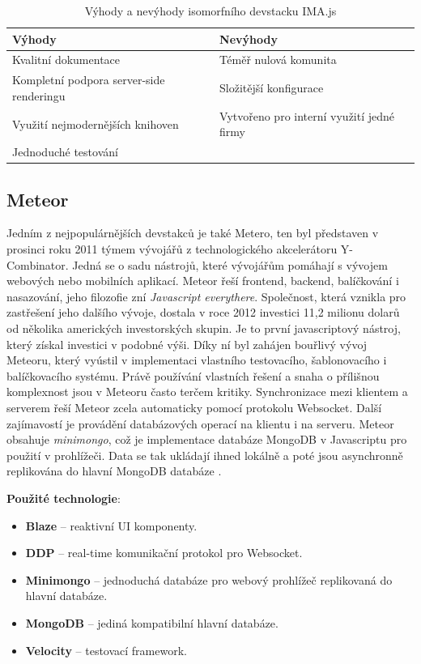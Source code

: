 \begin{table}[h]
\centering
	\caption{Výhody a nevýhody isomorfního devstacku IMA.js \cite{ima}}
	\begin{tabular}{ |C{5cm}|C{5cm}| }
	\hline
	Výhody & Nevýhody \\ \hline
	Kvalitní dokumentace & Téměř nulová komunita \\ \hline
	Kompletní podpora server-side renderingu & Složitější konfigurace \\ \hline
	Využití nejmodernějších knihoven & Vytvořeno pro interní využití jedné firmy \\ \hline
	Jednoduché testování & \\ \hline
    \end{tabular}
	\label{tab:proscons_ima}
\end{table}
\FloatBarrier

\subsection{Meteor}
Jedním z nejpopulárnějších devstakců je také Metero, ten byl představen v prosinci roku 2011 týmem vývojářů z technologického akcelerátoru Y-Combinator. Jedná se o sadu nástrojů, které vývojářům pomáhají s vývojem webových nebo mobilních aplikací. Meteor řeší frontend, backend, balíčkování i nasazování, jeho filozofie zní \textit{Javascript everythere}. Společnost, která vznikla pro zastřešení jeho dalšího vývoje, dostala v roce 2012 investici 11,2 milionu dolarů od několika amerických investorských skupin. Je to první javascriptový nástroj, který získal investici v podobné výši. Díky ní byl zahájen bouřlivý vývoj Meteoru, který vyústil v implementaci vlastního testovacího, šablonovacího i balíčkovacího systému. Právě používání vlastních řešení a snaha o přílišnou komplexnost jsou v Meteoru často terčem kritiky. Synchronizace mezi klientem a serverem řeší Meteor zcela automaticky pomocí protokolu Websocket. Další zajímavostí je provádění databázových operací na klientu i na serveru. Meteor obsahuje \textit{minimongo}, což je implementace databáze MongoDB v Javascriptu pro použití v prohlížeči. Data se tak ukládají ihned lokálně a poté jsou asynchronně replikována do hlavní MongoDB databáze \cite{isomorphic_pimentel} \cite{meteor} \cite{meteor_web}.

\vspace{0,3cm}
\noindent\textbf{Použité technologie}:
\begin{itemize}
\item \textbf{Blaze} – reaktivní UI komponenty.
\item \textbf{DDP} – real-time komunikační protokol pro Websocket.
\item \textbf{Minimongo} – jednoduchá databáze pro webový prohlížeč replikovaná do hlavní databáze.
\item \textbf{MongoDB} – jediná kompatibilní hlavní databáze.
\item \textbf{Velocity} – testovací framework.
\end{itemize}


